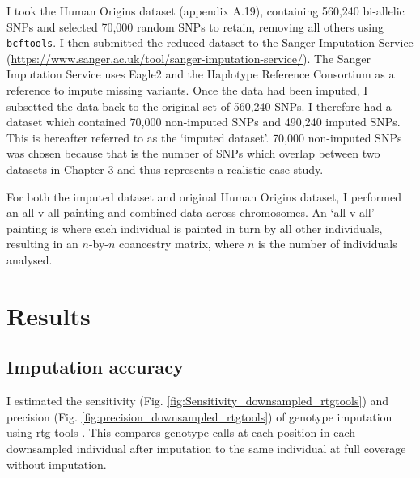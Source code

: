 I took the Human Origins dataset (appendix A.19), containing 560,240 bi-allelic SNPs and selected 70,000 random SNPs to retain, removing all others using \texttt{bcftools}. I then submitted the reduced dataset to the Sanger Imputation Service (\url{https://www.sanger.ac.uk/tool/sanger-imputation-service/}). The Sanger Imputation Service uses Eagle2 \cite{loh2016reference} and the Haplotype Reference Consortium as a reference to impute missing variants. Once the data had been imputed, I subsetted the data back to the original set of 560,240 SNPs. I therefore had a dataset which contained 70,000 non-imputed SNPs and 490,240 imputed SNPs. This is hereafter referred to as the `imputed dataset'. 70,000 non-imputed SNPs was chosen because that is the number of SNPs which overlap between two datasets in Chapter 3 and thus represents a realistic case-study. 

For both the imputed dataset and original Human Origins dataset, I performed an all-v-all painting and combined data across chromosomes. An `all-v-all' painting is where each individual is painted in turn by all other individuals, resulting in an $n$-by-$n$ coancestry matrix, where $n$ is the number of individuals analysed. 


\section{Results}

\subsection{Imputation accuracy}

I estimated the sensitivity (Fig. \ref{fig:Sensitivity_downsampled_rtgtools}) and precision (Fig.  \ref{fig:precision_downsampled_rtgtools}) of genotype imputation using rtg-tools \cite{cleary2014joint}. This compares genotype calls at each position in each downsampled individual after imputation to the same individual at full coverage without imputation.

